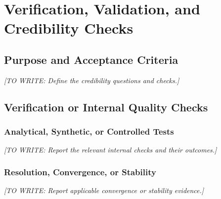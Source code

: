 \documentclass[12pt,a4paper,oneside]{report}
\newif\ifshowguidance
\newcommand{\Guide}[1]{%
  \ifshowguidance
  \begin{tcolorbox}[enhanced,breakable,colback=GuideBlue,
    colframe=GuideBorder,boxrule=0.5pt,arc=1mm,
    title={Writing guide --- replace with your research},
    colbacktitle=ThesisBlue,coltitle=white,fonttitle=\small\bfseries,
    before skip=10pt,after skip=10pt]
    \small #1
  \end{tcolorbox}
  \fi}
\newcommand{\Draft}[1]{\par\noindent\textit{[TO WRITE: #1]}\par}
\begin{document}
\chapter{Verification, Validation, and Credibility Checks}
\label{ch:validation}
\Guide{Retain a separate chapter when these checks are a substantial part
of the research; otherwise integrate them into methods/results. For numerical
models, verification examines whether the implementation solves the stated
model correctly; validation assesses agreement with suitable evidence for
the intended use. Neither establishes universal correctness. In empirical
or qualitative work, use the measurement-validity or trustworthiness checks
appropriate to the design instead of irrelevant numerical tests.}

\section{Purpose and Acceptance Criteria}
\Guide{State which aspect of credibility each check evaluates and why the
reference is suitable. Identify acceptance thresholds, their rationale,
and whether they were specified before observing the results.}
\Draft{Define the credibility questions and checks.}

\section{Verification or Internal Quality Checks}
\subsection{Analytical, Synthetic, or Controlled Tests}
\Guide{For code/models, compare against analytical solutions, manufactured
solutions, conservation laws, controlled inputs, or independently checked
calculations where applicable. For other studies, describe instrument,
coding, transcription, or data-integrity checks. State what each check
can and cannot establish.}
\Draft{Report the relevant internal checks and their outcomes.}
\subsection{Resolution, Convergence, or Stability}
\Guide{When applicable, test spatial/time resolution, sampling resolution,
optimizer convergence, tolerance sensitivity, or stability across repeated
runs. State the tested range, criterion, observed change, and chosen setting.
Low training loss alone does not demonstrate predictive accuracy.}
\Draft{Report applicable convergence or stability evidence.}
\end{document}

